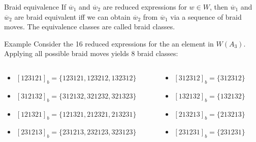 \documentclass[final]{beamer}
\newcommand{\w}{\overline{w}}
\begin{document}
\begin{frame}{}
\begin{columns}[T]
\begin{column}{.33\linewidth}

\begin{block}{Braid equivalence}
If $\w_1$ and $\w_2$ are reduced expressions for $w \in W$, then $\w_1$ and $\w_2$ are \alert{braid equivalent} iff we can obtain $\w_2$ from $\w_1$ via a sequence of braid moves. The equivalence classes are called \alert{braid classes}.
\end{block}

\begin{block}{Example}
Consider the 16 reduced expressions for the an element in $W(A_3)$. Applying all possible braid moves yields 8 braid classes:

\begin{columns}
\begin{column}{0.6\textwidth}
\begin{itemize}
\item[] $[123121]_b = \{123121,123212,132312\}$
\item[] $[312132]_b = \{312132,321232,321323\}$
\item[] $[121321]_b = \{121321,212321,213231\}$
\item[] $[231213]_b = \{231213,232123,323123\}$
\end{itemize}
\end{column}
\begin{column}{0.4\textwidth}
\begin{itemize}
\item[] $[312312]_b = \{312312\}$
\item[] $[132132]_b = \{132132\}$
\item[] $[213213]_b = \{213213\}$
\item[] $[231231]_b = \{231231\}$
\end{itemize}
\end{column}
\end{columns}
\vspace{.2em}
\end{block}



\end{column}
\end{columns}
\end{frame}
\end{document}
